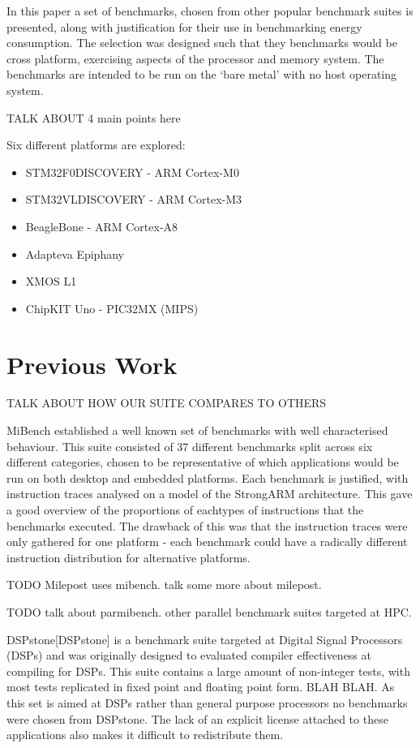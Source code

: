 \documentclass[twocolumn]{article}
\newcommand{\nsection}[1]{\section{\bfseries #1}}
\begin{document}
In this paper a set of benchmarks, chosen from other popular benchmark suites is presented, along with justification for their use in benchmarking energy consumption. The selection was designed such that they benchmarks would be cross platform, exercising aspects of the processor and memory system. The benchmarks are intended to be run on the ‘bare metal’ with no host operating system.

TALK ABOUT 4 main points here

Six different platforms are explored:
\begin{itemize}
	\item STM32F0DISCOVERY - ARM Cortex-M0
	\item STM32VLDISCOVERY - ARM Cortex-M3
	\item BeagleBone - ARM Cortex-A8
	\item Adapteva Epiphany
	\item XMOS L1
	\item ChipKIT Uno - PIC32MX (MIPS)
\end{itemize}

\nsection{Previous Work}

TALK ABOUT HOW OUR SUITE COMPARES TO OTHERS

MiBench established a well known set of benchmarks with well characterised behaviour. This suite consisted of 37 different benchmarks split across six different categories, chosen to be representative of which applications would be run on both desktop and embedded platforms. Each benchmark is justified, with instruction traces analysed on a model of the StrongARM architecture. This gave a good overview of the proportions of eachtypes of instructions that the benchmarks executed. The drawback of this was that the instruction traces were only gathered for one platform - each benchmark could have a radically different instruction distribution for alternative platforms.

TODO Milepost uses mibench. talk some more
about milepost.

TODO talk about parmibench. other parallel
benchmark suites targeted at HPC.

DSPstone[DSPstone] is a benchmark suite targeted at Digital Signal Processors (DSPs) and was originally designed to evaluated compiler effectiveness at compiling for DSPs. This suite contains a large amount of non-integer tests, with most tests replicated in fixed point and floating point form. BLAH BLAH. As this set is aimed at DSPs rather than general purpose processors no benchmarks were chosen from DSPstone. The lack of an explicit license attached to these applications also makes it difficult to redistribute them.
\end{document}
